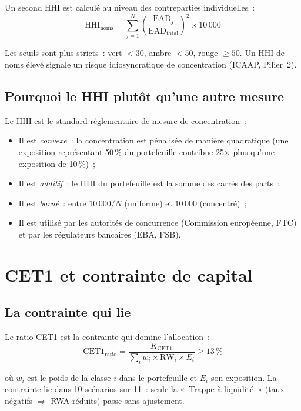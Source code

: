 \documentclass[12pt, a4paper, twoside, openright]{report}
\theoremstyle{definition}
\begin{document}
Un second HHI est calculé au niveau des contreparties individuelles~:
\begin{equation}
\text{HHI}_{\text{noms}} = \sum_{j=1}^{N} \left(\frac{\text{EAD}_j}{\text{EAD}_{\text{total}}}\right)^2 \times 10\,000
\label{eq:hhi-noms}
\end{equation}

Les seuils sont plus stricts~: vert $< 30$, ambre $< 50$, rouge $\geq 50$. Un HHI de noms élevé signale un risque idiosyncratique de concentration (ICAAP, Pilier~2).

\subsection{Pourquoi le HHI plutôt qu'une autre mesure}

Le HHI est le standard réglementaire de mesure de concentration~:
\begin{itemize}[nosep]
  \item Il est \emph{convexe}~: la concentration est pénalisée de manière quadratique (une exposition représentant 50\,\% du portefeuille contribue 25$\times$ plus qu'une exposition de 10\,\%)~;
  \item Il est \emph{additif}~: le HHI du portefeuille est la somme des carrés des parts~;
  \item Il est \emph{borné}~: entre $10\,000/N$ (uniforme) et $10\,000$ (concentré)~;
  \item Il est utilisé par les autorités de concurrence (Commission européenne, FTC) et par les régulateurs bancaires (EBA, FSB).
\end{itemize}

\section{CET1 et contrainte de capital}
\label{sec:metriques:cet1}

\subsection{La contrainte qui lie}

Le ratio CET1 est la contrainte qui domine l'allocation~:
\begin{equation}
\text{CET1}_{\text{ratio}} = \frac{K_{\text{CET1}}}{\sum_i w_i \times \text{RW}_i \times E_i} \geq 13\,\%
\label{eq:cet1}
\end{equation}

\noindent où $w_i$ est le poids de la classe $i$ dans le portefeuille et $E_i$ son exposition. La contrainte lie dans 10 scénarios sur 11~: seule la «~Trappe à liquidité~» (taux négatifs $\Rightarrow$ RWA réduits) passe sans ajustement.
\end{document}
